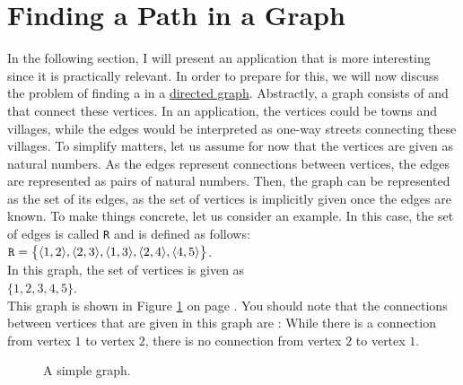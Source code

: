 \section{Finding a Path in a Graph}
In the following section, I will present an application that is more interesting since it is practically
relevant.  In order to prepare for this, we will now discuss the problem of finding a  in a
\href{https://en.wikipedia.org/wiki/Directed_graph}{directed graph}. 
Abstractly, a graph consists of  and  that connect these vertices.  In an application, the
vertices could be towns and villages, while the edges would be interpreted as one-way streets connecting these
villages.  To simplify matters, let us assume for now that the vertices are given as natural numbers.  As the
edges represent connections between vertices,  the edges are represented as pairs of natural numbers.  Then,
the graph can be represented as the set of its edges, as the set of vertices is implicitly given once the edges
are known.  To make things concrete, let us consider an example.  In this case, the set of edges is called
\texttt{R} and is defined as follows:  
\\[0.2cm]
\hspace*{1.3cm}
$\texttt{R}\; \mathtt{=}\; \bigl\{ \pair(1,2), \pair(2,3), \pair(1,3), \pair(2,4), \pair(4,5) \bigr\}$.
\\[0.2cm]
In this graph, the set of vertices is given as
\\[0.2cm]
\hspace*{1.3cm}
$\{ 1, 2, 3, 4, 5 \}$.
\\[0.2cm]
This graph is shown in Figure \ref{fig:graph0} on page \pageref{fig:graph0}.  You should note that the
connections between vertices that are given in this graph are :  While there is a connection from
vertex $1$ to vertex $2$, there is no connection from vertex $2$ to vertex $1$.

 
\begin{figure}[!ht]
  \centering

  \caption{A simple graph.}
  \label{fig:graph0}
\end{figure}



